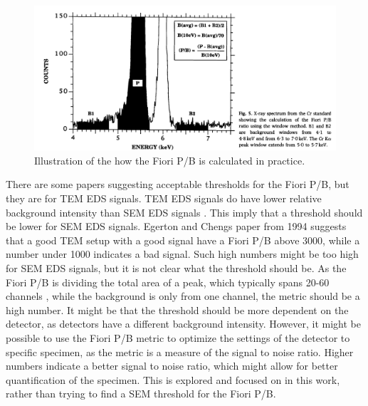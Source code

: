 \begin{figure}
    \centering
    \includegraphics[width=0.6\linewidth]{figures/FioriPB_reality_TODO_remake.png}
    \caption{Illustration of the how the Fiori P/B is calculated in practice.
        }
    \label{fig:fiori_pb_reality}
\end{figure}


There are some papers suggesting acceptable thresholds for the Fiori P/B, but they are for TEM EDS signals.
TEM EDS signals do have lower relative background intensity than SEM EDS signals .
This imply that a threshold should be lower for SEM EDS signals.
Egerton and Chengs paper from 1994 \cite{egerton_eds_1994} suggests that a good TEM setup with a good signal have a Fiori P/B above 3000, while a number under 1000 indicates a bad signal.
Such high numbers might be too high for SEM EDS signals, but it is not clear what the threshold should be.
As the Fiori P/B is dividing the total area of a peak, which typically spans 20-60 channels , while the background is only from one channel, the metric should be a high number.
It might be that the threshold should be more dependent on the detector, as detectors have a different background intensity.
However, it might be possible to use the Fiori P/B metric to optimize the settings of the detector to specific specimen, as the metric is a measure of the signal to noise ratio.
Higher numbers indicate a better signal to noise ratio, which might allow for better quantification of the specimen.
This is explored and focused on in this work, rather than trying to find a SEM threshold for the Fiori P/B.




